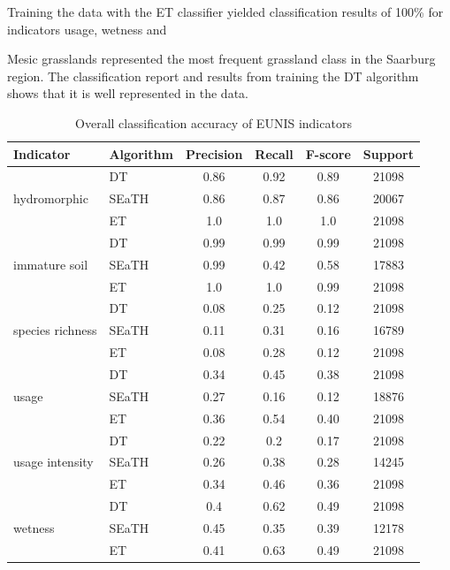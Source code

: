 \documentclass[authoryear, review,12pt,number]{elsarticle}
\begin{document}
Training the data with the ET classifier yielded classification results of
100\% for indicators usage, wetness and

Mesic grasslands represented the most frequent grassland class in the Saarburg 
region. The classification report and results from training the DT algorithm  
shows that it is well represented in the data.

\begin{table}
    \centering
    \begin{tabular}{l l c c c c}
    Indicator & Algorithm & Precision & Recall & F-score & 
Support\\
    \hline
    \multirow{3}{*}{hydromorphic}
    & DT & 0.86 & 0.92 & 0.89 & 21098\\
    & SEaTH & 0.86 & 0.87 & 0.86 & 20067\\
    & ET & 1.0 & 1.0 & 1.0 & 21098\\
    \cline{2-6}
    \multirow{3}{*}{immature soil}
    & DT & 0.99 & 0.99 & 0.99 & 21098\\
    & SEaTH & 0.99 & 0.42 & 0.58 & 17883\\
    & ET & 1.0 & 1.0 & 0.99 & 21098\\
    \multirow{3}{*}{species richness}
    & DT & 0.08 & 0.25 & 0.12 & 21098\\
    & SEaTH & 0.11 & 0.31 & 0.16 & 16789\\
    & ET & 0.08 & 0.28 & 0.12 & 21098\\
    \cline{2-6}
    \multirow{3}{*}{usage}
    & DT & 0.34 & 0.45 & 0.38 & 21098\\
    & SEaTH & 0.27 & 0.16 & 0.12 & 18876\\
    & ET & 0.36 & 0.54 & 0.40 & 21098\\
    \cline{2-6}
    \multirow{3}{*}{usage intensity}
    & DT & 0.22 & 0.2 & 0.17 & 21098\\
    & SEaTH & 0.26 & 0.38 & 0.28 & 14245\\
    & ET & 0.34 & 0.46 & 0.36 & 21098\\
    \cline{2-6}
    \multirow{3}{*}{wetness}
    & DT & 0.4 & 0.62 & 0.49 & 21098\\
    & SEaTH & 0.45 & 0.35 & 0.39 & 12178\\
    & ET & 0.41 & 0.63 & 0.49 & 21098\\
    \end{tabular}
    \caption{Overall classification accuracy of EUNIS indicators}
\end{table}
\end{document}

